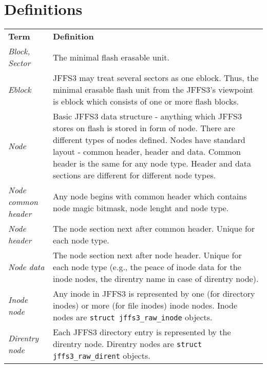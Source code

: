 \documentclass[12pt,a4paper,twoside,titlepage]{article}
\begin{document}
\section*{Definitions}
\begin{tabular}{p{3cm}p{11cm}}

\large \textbf{Term}
&
\large \textbf{Definition}
\\[7pt]

\raggedright \emph{Block, Sector} 
&
The minimal flash erasable unit. \\[4pt]

\raggedright \emph{Eblock}
&
JFFS3 may treat several sectors as one eblock. Thus, the minimal
erasable flash unit from the JFFS3's viewpoint is eblock which consists
of one or more flash blocks. \\[4pt]

\raggedright \emph{Node} 
&
Basic JFFS3 data structure - anything which JFFS3 stores on flash is
stored in form of node. There are different types of nodes defined.
Nodes have standard layout - common header, header and
data. Common header is the same for any node type. Header and
data sections are different for different node types.
\\[4pt]

\raggedright \emph{Node common header} 
&
Any node begins with common header which contains node magic
bitmask, node lenght and node type.
\\[4pt]

\raggedright \emph{Node header}
&
The node section next after common header. Unique for each node type.
\\[4pt]
	
\raggedright \emph{Node data}
&
The node section next after node header. Unique for each node type
(e.g., the peace of inode data for the inode nodes, the direntry name in
case of direntry node).
\\[4pt]

\raggedright \emph{Inode node}
&
Any inode in JFFS3 is represented by one (for directory inodes) or more
(for file inodes) inode nodes. Inode nodes are
\texttt{struct jffs3\_raw\_inode} objects.
\\[4pt]

\raggedright \emph{Direntry node}
&
Each JFFS3 directory entry is represented by the direntry node.
Direntry nodes are \texttt{struct jffs3\_raw\_dirent} objects.

\end{tabular}
\newpage
\end{document}
